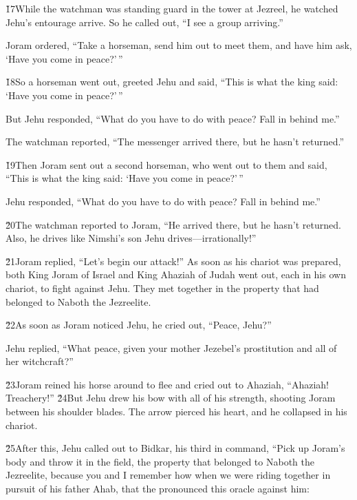 \v{17}While the watchman was standing guard in the tower at Jezreel, he watched Jehu's entourage arrive. So he called out, ``I see a group arriving.''

Joram ordered, ``Take a horseman, send him out to meet them, and have him ask, `Have you come in peace?'\,''

\v{18}So a horseman went out, greeted Jehu and said, ``This is what the king said: `Have you come in peace?'\,''

But Jehu responded, ``What do you have to do with peace? Fall in behind me.''

The watchman reported, ``The messenger arrived there, but he hasn't returned.''

\v{19}Then Joram sent out a second horseman, who went out to them and said, ``This is what the king said: `Have you come in peace?'\,''

Jehu responded, ``What do you have to do with peace? Fall in behind me.''

\v{20}The watchman reported to Joram, ``He arrived there, but he hasn't returned. Also, he drives like Nimshi's son Jehu drives---irrationally!''

\v{21}Joram replied, ``Let's begin our attack!'' As soon as his chariot was prepared, both King Joram of Israel and King Ahaziah of Judah went out, each in his own chariot, to fight against Jehu. They met together in the property that had belonged to Naboth the Jezreelite.

\v{22}As soon as Joram noticed Jehu, he cried out, ``Peace, Jehu?''

Jehu replied, ``What peace, given your mother Jezebel's prostitution and all of her witchcraft?''

\v{23}Joram reined his horse around to flee and cried out to Ahaziah, ``Ahaziah! Treachery!'' \v{24}But Jehu drew his bow with all of his strength, shooting Joram between his shoulder blades. The arrow pierced his heart, and he collapsed in his chariot.

\v{25}After this, Jehu called out to Bidkar, his third in command, ``Pick up Joram's body and throw it in the field, the property that belonged to Naboth the Jezreelite, because you and I remember how when we were riding together in pursuit of his father Ahab, that the  pronounced this oracle against him:

